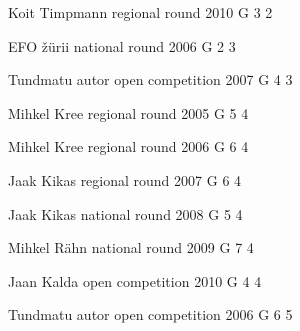 \documentclass[11pt]{article}
\begin{document}
\ylDisplay{} %
{Koit Timpmann} %
{regional round} %
{2010} %
{G 3} %
{2} %
{

\ifEngSolution
\fi
}

\ylDisplay{} %
{EFO žürii} %
{national round} %
{2006} %
{G 2} %
{3} %
{

\ifEngSolution
\fi
}

\ylDisplay{} %
{Tundmatu autor} %
{open competition} %
{2007} %
{G 4} %
{3} %
{

\ifEngSolution
\fi
}

\ylDisplay{} %
{Mihkel Kree} %
{regional round} %
{2005} %
{G 5} %
{4} %
{

\ifEngSolution
\fi
}

\ylDisplay{} %
{Mihkel Kree} %
{regional round} %
{2006} %
{G 6} %
{4} %
{

\ifEngSolution
\fi
}

\ylDisplay{} %
{Jaak Kikas} %
{regional round} %
{2007} %
{G 6} %
{4} %
{

\ifEngSolution
\fi
}

\ylDisplay{} %
{Jaak Kikas} %
{national round} %
{2008} %
{G 5} %
{4} %
{

\ifEngSolution
\fi
}

\ylDisplay{} %
{Mihkel Rähn} %
{national round} %
{2009} %
{G 7} %
{4} %
{

\ifEngSolution
\fi
}

\ylDisplay{} %
{Jaan Kalda} %
{open competition} %
{2010} %
{G 4} %
{4} %
{

\ifEngSolution
\fi
}

\ylDisplay{} %
{Tundmatu autor} %
{open competition} %
{2006} %
{G 6} %
{5} %
{

\ifEngSolution
\fi
}
\end{document}
